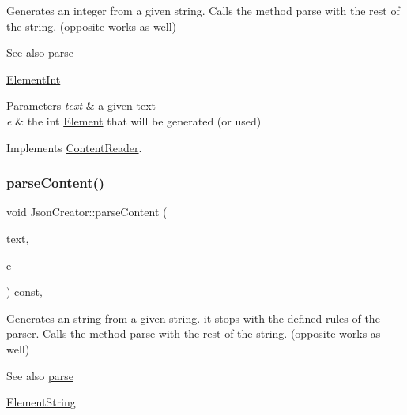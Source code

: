 Generates an integer from a given string. Calls the method parse with the rest of the string. (opposite works as well) \begin{DoxySeeAlso}{See also}
\mbox{\hyperlink{classJsonCreator_a505ff309c6b144d29478804b0e187c6f}{parse}} 

\mbox{\hyperlink{classElementInt}{Element\+Int}}
\end{DoxySeeAlso}

\begin{DoxyParams}{Parameters}
{\em text} & a given text \\
\hline
{\em e} & the int \mbox{\hyperlink{classElement}{Element}} that will be generated (or used) \\
\hline
\end{DoxyParams}


Implements \mbox{\hyperlink{classContentReader_a7eef37b8b9761e21c0a3907ff94c72f7}{Content\+Reader}}.

\mbox{\label{classJsonCreator_acf8d7cd3dcbb669fd9eb5dec95e069f3}} 
\subsubsection{\texorpdfstring{parse\+Content()}{parseContent()}\hspace{0.1cm}{\footnotesize\ttfamily [2/6]}}
{\footnotesize\ttfamily void Json\+Creator\+::parse\+Content (\begin{DoxyParamCaption}\item[{std\+::string \&}]{text,  }\item[{\mbox{\hyperlink{classElementString}{Element\+String}} $\ast$}]{e }\end{DoxyParamCaption}) const\hspace{0.3cm}{\ttfamily [override]}, {\ttfamily [virtual]}}

Generates an string from a given string. it stops with the defined rules of the parser. Calls the method parse with the rest of the string. (opposite works as well) \begin{DoxySeeAlso}{See also}
\mbox{\hyperlink{classJsonCreator_a505ff309c6b144d29478804b0e187c6f}{parse}} 

\mbox{\hyperlink{classElementString}{Element\+String}}
\end{DoxySeeAlso}

